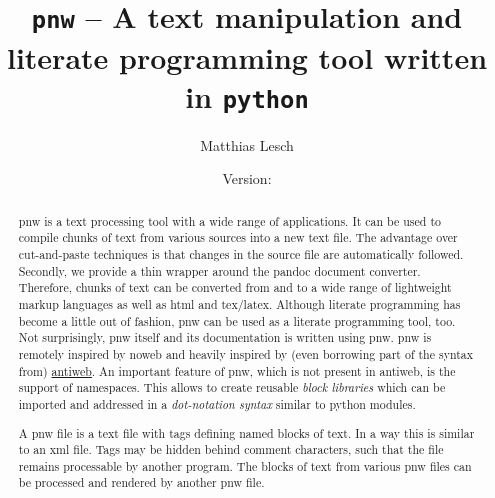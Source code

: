 \documentclass[neutral,proc,reqno]{ml-gen}
\begin{document}
\lstset{%
language=Python,
basicstyle=\small,
columns=fullflexible}

\title[\texttt{pnw}]{\texttt{pnw} -- A text manipulation and literate
programming tool written in \texttt{python}}

\author{Matthias Lesch}
\address{Mathematisches Institut,
Universit\"at Bonn,
Endenicher Allee 60,
53115 Bonn,
Germany}

%


\date{Version: }
\begin{abstract}
pnw is a text processing tool with a wide range of applications. It can
be used to compile chunks of text from various sources into a new text
file. The advantage over cut-and-paste techniques is that changes in the
source file are automatically followed. Secondly, we provide a thin
wrapper around the pandoc document converter. Therefore, chunks of text
can be converted from and to a wide range of lightweight markup
languages as well as html and tex/latex. Although literate programming
has become a little out of fashion, pnw can be used as a literate
programming tool, too. Not surprisingly, pnw itself and its
documentation is written using pnw. pnw is remotely inspired by noweb
and heavily inspired by (even borrowing part of the syntax from)
\href{https://pypi.python.org/pypi/antiweb/0.2.2}{antiweb}. An important
feature of pnw, which is not present in antiweb, is the support of
namespaces. This allows to create reusable \emph{block libraries} which
can be imported and addressed in a \emph{dot-notation syntax} similar to
python modules.

A pnw file is a text file with tags defining named blocks of text. In a
way this is similar to an xml file. Tags may be hidden behind comment
characters, such that the file remains processable by another program.
The blocks of text from various pnw files can be processed and rendered
by another pnw file.

\end{abstract}

\maketitle
\tableofcontents
\end{document}
